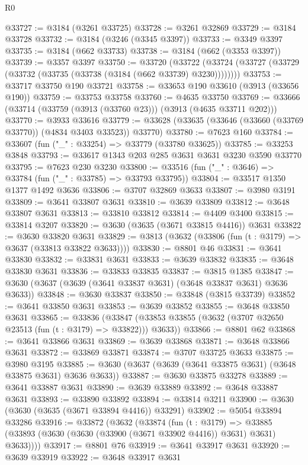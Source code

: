 \begin{lexlean}{R0}
\begin{coremodule}
@33727 := @3184 (@3261 @33725)
@33728 := @3261 @32869
@33729 := @3184 @33728
@33732 := @3184 (@3246 (@3345 @3397))
@33733 := @3349 @3397
@33735 := @3184 (@662 @33733)
@33738 := @3184 (@662 (@3353 @3397))
@33739 := @3357 @3397
@33750 := @33720
    (@33722 (@33724 (@33727 (@33729 (@33732 (@33735 (@33738 (@3184 (@662 @33739) @3230))))))))
@33753 := @33717 @33750 @190 @33721
@33758 := @33653 @190 @33610 (@3913 (@33656 @190))
@33759 := @33753 @33758
@33760 := @4635 @33750
@33769 := @33666 (@33714 (@33759 (@3913 (@33760 @23))) (@3913 (@4635 @33711 @202)))
@33770 := @3933 @33616
@33779 := @33628 (@33635 (@33646 (@33660 (@33769 @33770)) (@4834 @3403 @33523)) @33770)
@33780 := @7623 @160
@33784 := @33607 (fun ("_" : @33254) => @33779 (@33780 @33625))
@33785 := @33253 @3848
@33793 := @33617 @1343 @203 @285 @3631 @3631 @3230 @3590 @33770
@33795 := @7623 @230 @3230
@33800 := @33516 (fun ("_" : @3646) => @33784 (fun ("_" : @33785) => @33793 @33795))
@33804 := @33517 @1350 @1377 @1492 @3636
@33806 := @3707 @32869 @3633
@33807 := @3980 @3191
@33809 := @3641 @33807 @3631
@33810 := @3639 @33809
@33812 := @3648 @33807 @3631
@33813 := @33810 @33812
@33814 := @4409 @3400
@33815 := @33814 @3207
@33820 := @3630 (@3635 (@3671 @33815 @4416)) @3631
@33822 := @3630 @33820 @3631
@33829 := @3813 (@3632 (@33806 (fun (t : @3179) => @3637 (@33813 @33822 @3633))))
@33830 := @8801 @46
@33831 := @3641 @33830
@33832 := @33831 @3631
@33833 := @3639 @33832
@33835 := @3648 @33830 @3631
@33836 := @33833 @33835
@33837 := @3815 @1385
@33847 := @3630 (@3637 (@3639 (@3641 @33837 @3631) (@3648 @33837 @3631) @3636 @3633))
@33848 := @3630 @33837
@33850 := @33848 (@3815 @33739)
@33852 := @3641 @33850 @3631
@33853 := @3639 @33852
@33855 := @3648 @33850 @3631
@33865 := @33836
    (@33847 (@33853 @33855 (@3632 (@3707 @32650 @23513 (fun (t : @3179) => @33822))) @3633))
@33866 := @8801 @62
@33868 := @3641 @33866 @3631
@33869 := @3639 @33868
@33871 := @3648 @33866 @3631
@33872 := @33869 @33871
@33874 := @3707 @33725 @3633
@33875 := @3980 @3195
@33885 := @3630 (@3637 (@3639 (@3641 @33875 @3631) (@3648 @33875 @3631) @3636 @3633))
@33887 := @3630 @33875 @33278
@33889 := @3641 @33887 @3631
@33890 := @3639 @33889
@33892 := @3648 @33887 @3631
@33893 := @33890 @33892
@33894 := @33814 @3211
@33900 := @3630 (@3630 (@3635 (@3671 @33894 @4416)) @33291)
@33902 := @5054 @33894 @33286
@33916 := @33872
    (@3632
      (@33874
        (fun (t : @3179) =>
        @33885 (@33893 (@3630 (@3630 (@33900 (@3671 @33902 @4416)) @3631) @3631) @3633))))
@33917 := @8801 @76
@33919 := @3641 @33917 @3631
@33920 := @3639 @33919
@33922 := @3648 @33917 @3631

\end{coremodule}
\end{lexlean}
